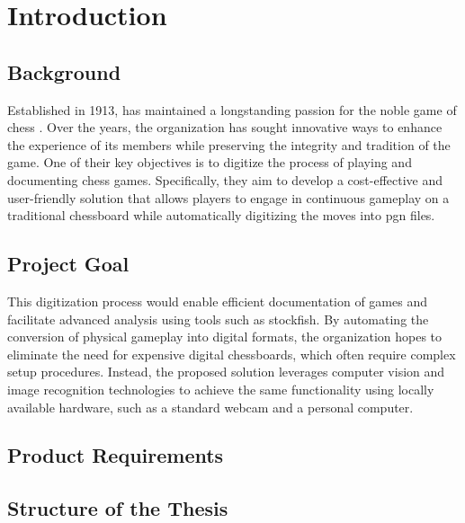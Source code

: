 \chapter{Introduction}

\section{Background}

Established in 1913, \aas has maintained a longstanding passion for the noble game of chess \cite{schaklag:63}. Over the years, the organization has sought innovative ways to enhance the experience of its members while preserving the integrity and tradition of the game. One of their key objectives is to digitize the process of playing and documenting chess games. Specifically, they aim to develop a cost-effective and user-friendly solution that allows players to engage in continuous gameplay on a traditional chessboard while automatically digitizing the moves into \gls{pgn} files.

\section{Project Goal}

This digitization process would enable efficient documentation of games and facilitate advanced analysis using tools such as \Gls{stockfish}. By automating the conversion of physical gameplay into digital formats, the organization hopes to eliminate the need for expensive digital chessboards, which often require complex setup procedures. Instead, the proposed solution leverages computer vision and image recognition technologies to achieve the same functionality using locally available hardware, such as a standard webcam and a personal computer.

\section{Product Requirements}



\section{Structure of the Thesis}


